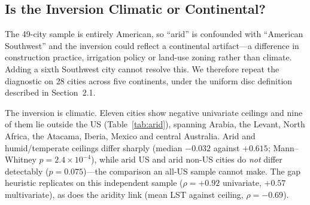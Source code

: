 \documentclass[remotesensing,article,submit,oneauthor]{Definitions/mdpi}
\begin{document}
\subsection{Is the Inversion Climatic or Continental?}

The 49-city sample is entirely American, so ``arid'' is confounded with
``American Southwest'' and the inversion could reflect a continental
artifact---a difference in construction practice, irrigation policy or
land-use zoning rather than climate. Adding a sixth Southwest city cannot
resolve this. We therefore repeat the diagnostic on 28 cities across five
continents, under the uniform disc definition described in
Section~2.1.

The inversion is climatic. Eleven cities show negative univariate
ceilings and nine of them lie outside the US (Table~\ref{tab:arid}),
spanning Arabia, the Levant, North Africa, the Atacama, Iberia, Mexico
and central Australia. Arid and
humid/temperate ceilings differ sharply (median $-0.032$ against
$+0.615$; Mann--Whitney $p = 2.4 \times 10^{-4}$), while arid US and arid
non-US cities do \emph{not} differ detectably ($p = 0.075$)---the
comparison an all-US sample cannot make. The gap heuristic replicates on
this independent sample ($\rho = +0.92$ univariate, $+0.57$
multivariate), as does the aridity link (mean LST against ceiling,
$\rho = -0.69$).
\end{document}
